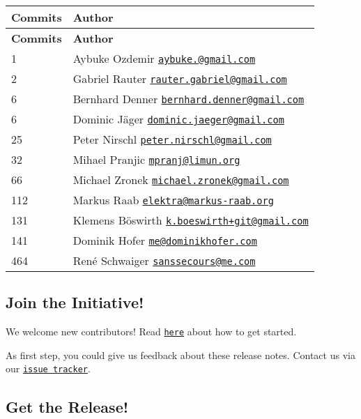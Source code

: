 \tabulinesep=1mm
\begin{longtabu} spread 0pt [c]{*{2}{|X[-1]}|}
\hline
\rowcolor{\tableheadbgcolor}\textbf{ Commits }&\textbf{ Author  }\\
\endfirsthead
\hline
\endfoot
\hline
\rowcolor{\tableheadbgcolor}\textbf{ Commits }&\textbf{ Author  }\\
 &Aybuke Ozdemir \href{mailto:aybuke.147@gmail.com}{\tt aybuke.@gmail.\+com} \\
2 &Gabriel Rauter \href{mailto:rauter.gabriel@gmail.com}{\tt rauter.\+gabriel@gmail.\+com} \\
6 &Bernhard Denner \href{mailto:bernhard.denner@gmail.com}{\tt bernhard.\+denner@gmail.\+com} \\
6 &Dominic Jäger \href{mailto:dominic.jaeger@gmail.com}{\tt dominic.\+jaeger@gmail.\+com} \\
25 &Peter Nirschl \href{mailto:peter.nirschl@gmail.com}{\tt peter.\+nirschl@gmail.\+com} \\
32 &Mihael Pranjic \href{mailto:mpranj@limun.org}{\tt mpranj@limun.\+org} \\
66 &Michael Zronek \href{mailto:michael.zronek@gmail.com}{\tt michael.\+zronek@gmail.\+com} \\
112 &Markus Raab \href{mailto:elektra@markus-raab.org}{\tt elektra@markus-\/raab.\+org} \\
131 &Klemens Böswirth \href{mailto:k.boeswirth+git@gmail.com}{\tt k.\+boeswirth+git@gmail.\+com} \\
141 &Dominik Hofer \href{mailto:me@dominikhofer.com}{\tt me@dominikhofer.\+com} \\
464 &René Schwaiger \href{mailto:sanssecours@me.com}{\tt sanssecours@me.\+com} \\
\end{longtabu}
\subsection*{Join the Initiative!}

We welcome new contributors! Read \href{https://www.libelektra.org/devgettingstarted/ideas}{\tt here} about how to get started.

As first step, you could give us feedback about these release notes. Contact us via our \href{https://issues.libelektra.org}{\tt issue tracker}.

\subsection*{Get the Release!}

